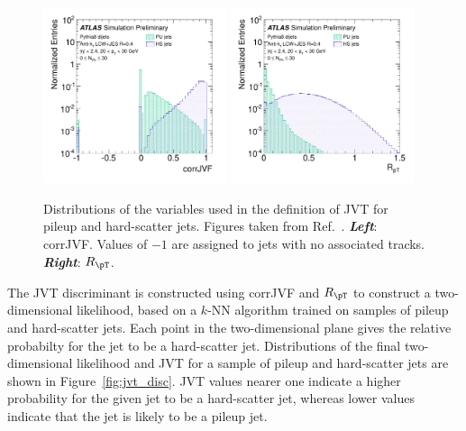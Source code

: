 \begin{figure}[!htb]
    \begin{center}
        \includegraphics[width=0.48\textwidth]{figures/chapter3/jets/jvt_corrJVF}
        \includegraphics[width=0.48\textwidth]{figures/chapter3/jets/jvt_rpt}
        \caption{
            Distributions of the variables used in the definition of JVT for pileup and hard-scatter jets.
            Figures taken from Ref.~\cite{JVT}.
            \textit{\textbf{Left}}: corrJVF. Values of $-1$ are assigned to jets with no associated tracks.
            \textit{\textbf{Right}}: $R_{\pT}$.
        }
        \label{fig:jvt_vars}
    \end{center}
\end{figure}

The JVT discriminant is constructed using corrJVF and $R_{\pT}$ to construct a two-dimensional likelihood,
based on a $k$-NN algorithm trained on samples of pileup and hard-scatter jets.
Each point in the two-dimensional plane gives the relative probabilty for the jet to be a hard-scatter jet.
Distributions of the final two-dimensional likelihood and JVT for a sample of pileup
and hard-scatter jets are shown in Figure~\ref{fig:jvt_disc}.
JVT values nearer one indicate a higher probability for the given jet to be a hard-scatter jet, whereas
lower values indicate that the jet is likely to be a pileup jet.

